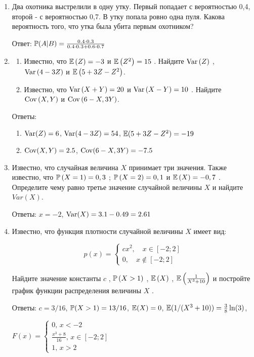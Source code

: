\documentclass[12pt, a4paper]{article}\usepackage[]{graphicx}\usepackage[]{color}
\begin{document}
\begin{enumerate}
\item Два охотника выстрелили в одну утку. Первый попадает с вероятностью 0,4, второй - с вероятностью 0,7. В утку попала ровно одна пуля. Какова вероятность того, что утка была убита первым охотником?

Ответ:
$\P(A|B)=\frac{0.4\cdot 0.3 }{0.4\cdot 0.3+0.6\cdot 0.7}$

\item
\begin{enumerate}
\item Известно, что  $\E\left(Z\right)=-3$  и  $\E\left(Z^{2} \right)=15$ . Найдите  $\Var\left(Z\right)$ ,  $\Var\left(4-3Z\right)$  и  $\E\left(5+3Z-Z^{2} \right)$.
\item Известно, что  $\Var\left(X+Y\right)=20$  и  $\Var\left(X-Y\right)=10$ . Найдите  $\Cov\left(X,Y\right)$  и  $\Cov\left(6-X,3Y\right)$.
\end{enumerate}
Ответы:
\begin{enumerate}
\item $\Var(Z)=6$, $\Var(4-3Z)=54$, $\E(5+3Z-Z^2)=-19$
\item $\Cov(X,Y)=2.5$, $\Cov(6-X,3Y)=-7.5$
\end{enumerate}

\item Известно, что случайная величина  $X$  принимает три значения. Также известно, что  $\P\left(X=1\right)=0,3$ ;  $\P\left(X=2\right)=0,1$  и  $\E\left(X\right)=-0,7$ . Определите чему равно третье значение случайной величины  $X$  и найдите  $Var\left(X\right)$.

Ответы: $x=-2$, $\Var(X)=3.1-0.49=2.61$

\item Известно, что функция плотности случайной величины  $X$  имеет вид:

$$p\left(x\right)=\left\{\begin{array}{l} {cx^{2} ,\quad x\in [-2;2]} \\ {0,\quad x\notin [-2;2]} \end{array}\right. $$

Найдите значение константы  $c$ ,  $\P\left(X>1\right)$ ,  $\E\left(X\right)$ ,  $\E\left(\frac{1}{X^{3} +10} \right)$  и постройте график функции распределения величины  $X$ .

Ответы: $c=3/16$, $\P(X>1)=13/16$, $\E(X)=0$, $\E(1/(X^3+10))=\frac{3}{8}\ln(3)$,

$F(x)=\begin{cases}
0, \, x<-2 \\
\frac{x^3+8}{16}, \, x\in [-2;2] \\
1, \, x>2
\end{cases}$


\end{enumerate}
\end{document}
